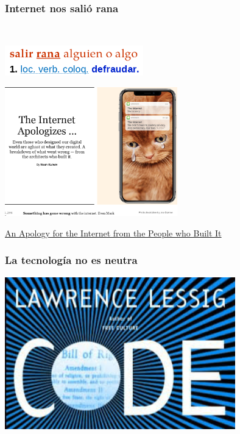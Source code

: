 \documentclass[17pt,aspectratio=169,hyperref=pdfusetitle]{beamer}
\begin{document}
\begin{frame}[fragile]
  \frametitle{Internet nos salió rana}

  ~
  \vspace{2cm}
  \begin{flushright}
  \includegraphics[width=6cm]{figs/salir-rana}
  \end{flushright}

\end{frame}


\begin{frame}[fragile]

  \begin{center}
  \includegraphics[width=7.5cm]{figs/apology-internet}
  \end{center}

  \begin{flushright}
    {\small
      \href{http://nymag.com/selectall/2018/04/an-apology-for-the-internet-from-the-people-who-built-it.html}{An Apology for the Internet from the People who Built It}
    }
  \end{flushright}

\end{frame}


\begin{frame}[fragile]
  \frametitle{La tecnología no es neutra}

  \begin{center}
  \includegraphics[width=10cm]{figs/code-is-law}
  \end{center}

\end{frame}
\end{document}
